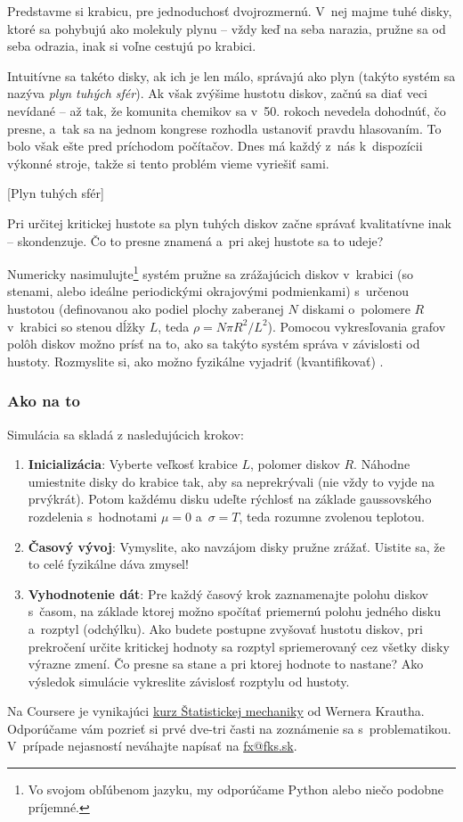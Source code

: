 Predstavme si krabicu, pre jednoduchosť dvojrozmernú. V~nej majme tuhé disky,
ktoré sa pohybujú ako molekuly plynu -- vždy keď na seba narazia, pružne sa od seba odrazia,
inak si voľne cestujú po krabici. 

Intuitívne sa takéto disky, ak ich je len málo, správajú ako plyn (takýto systém sa nazýva \emph{plyn tuhých sfér}). 
Ak však zvýšime hustotu diskov, začnú sa diať veci nevídané -- až tak, že komunita chemikov sa v~50. rokoch
nevedela dohodnúť, čo presne, a~tak sa na jednom kongrese rozhodla ustanoviť pravdu hlasovaním.
To bolo však ešte pred príchodom počítačov. Dnes má každý z~nás k~dispozícii výkonné stroje,
takže si tento problém vieme vyriešiť sami.

[Plyn tuhých sfér]

Pri určitej kritickej hustote sa plyn tuhých diskov začne správať kvalitatívne inak -- skondenzuje.
Čo to presne znamená a~pri akej hustote sa to udeje?

Numericky nasimulujte\footnote{Vo svojom obľúbenom jazyku, my odporúčame Python alebo niečo podobne príjemné.}
systém pružne sa zrážajúcich diskov v~krabici (so stenami, alebo ideálne periodickými okrajovými podmienkami)
s~určenou hustotou (definovanou ako podiel plochy zaberanej $N$ diskami o~polomere $R$ v~krabici so stenou dĺžky $L$,
teda  $\rho = N\pi R^2/L^2$). Pomocou vykresľovania grafov polôh diskov možno prísť na to,
ako sa takýto systém správa v závislosti od hustoty. Rozmyslite si,
ako možno fyzikálne vyjadriť (kvantifikovať) .

\subsubsection{Ako na to}
Simulácia sa skladá z nasledujúcich krokov:
\begin{enumerate}[label=\alph*)]
	\item \textbf{Inicializácia}: Vyberte veľkosť krabice $L$, polomer diskov $R$.
		Náhodne umiestnite disky do krabice tak, aby sa neprekrývali (nie vždy to vyjde na prvýkrát).
		Potom každému disku udeľte rýchlosť na základe gaussovského rozdelenia s~hodnotami $\mu=0$ a~$\sigma = T$,
		teda rozumne zvolenou teplotou.
	\item \textbf{Časový vývoj}: Vymyslite, ako navzájom disky pružne zrážať.
		Uistite sa, že to celé fyzikálne dáva zmysel!
	\item \textbf{Vyhodnotenie dát}: Pre každý časový krok zaznamenajte polohu diskov s~časom,
		na základe ktorej možno spočítať priemernú polohu jedného disku a~rozptyl (odchýlku).
		Ako budete postupne zvyšovať hustotu diskov, pri prekročení určite kritickej hodnoty sa
		rozptyl spriemerovaný cez všetky disky výrazne zmení. Čo presne sa stane a pri ktorej hodnote to nastane?
		Ako výsledok simulácie vykreslite závislosť rozptylu od hustoty.
\end{enumerate}

Na Coursere je vynikajúci \href{https://www.coursera.org/course/smac}{kurz Štatistickej mechaniky}
od Wernera Krautha. Odporúčame vám pozrieť si prvé dve-tri časti na zoznámenie sa s~problematikou.
V~prípade nejasností neváhajte napísať na \url{fx@fks.sk}.

